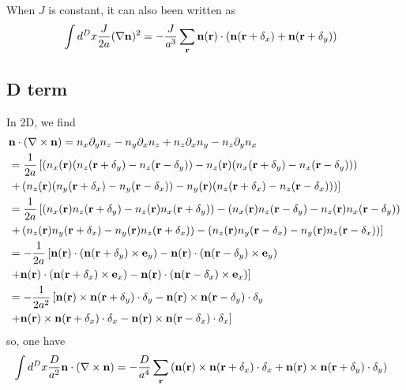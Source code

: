 \documentclass[aps,superscriptaddress,groupedaddress]{revtex4}  %
\begin{document}
When $J$ is constant, it can also been written as
\begin{equation}
\begin{split}
&\int d^D x\frac{J}{2a}(\nabla {\bf n})^2=-\frac{J}{a^3}\sum _{{\bf r}}{\bf n}({\bf r})\cdot \left( {\bf n}({\bf r}+\delta _x)+{\bf n}({\bf r}+\delta _y)\right)
\end{split}
\end{equation}


\subsection{\label{sec:2.3}D term}

In 2D, we find
\begin{equation}
\begin{split}
&{\bf n}\cdot (\nabla \times {\bf n})=n_x \partial _y n_z-n_y \partial _x n_z+n_z\partial _x n_y-n_z \partial _y n_x\\
&=\frac{1}{2a}\left[\left(n_x({\bf r})(n_z({\bf r}+\delta _y)-n_z({\bf r}-\delta _y))-n_z({\bf r})(n_x({\bf r}+\delta _y)-n_x({\bf r}-\delta _y))\right)\right.\\
&\left.+\left(n_z({\bf r})(n_y({\bf r}+\delta _x)-n_y({\bf r}-\delta _x))-n_y({\bf r})(n_z({\bf r}+\delta _x)-n_z({\bf r}-\delta _x))\right)\right]\\
&=\frac{1}{2a}\left[\left(n_x({\bf r})n_z({\bf r}+\delta _y)-n_z({\bf r})n_x({\bf r}+\delta _y)\right)-\left(n_x({\bf r})n_z({\bf r}-\delta _y)-n_z({\bf r})n_x({\bf r}-\delta _y)\right)\right.\\
&\left.+\left(n_z({\bf r})n_y({\bf r}+\delta _x)-n_y({\bf r})n_z({\bf r}+\delta _x)\right)-\left(n_z({\bf r})n_y({\bf r}-\delta _x)-n_y({\bf r})n_z({\bf r}-\delta _x)\right)\right]\\
&=-\frac{1}{2a}\left[{\bf n}({\bf r})\cdot \left({\bf n}({\bf r}+\delta _y)\times {\bf e}_y\right)-{\bf n}({\bf r})\cdot \left({\bf n}({\bf r}-\delta _y)\times {\bf e}_y\right)\right.\\
&\left.+{\bf n}({\bf r})\cdot \left({\bf n}({\bf r}+\delta _x)\times {\bf e}_x\right)-{\bf n}({\bf r})\cdot \left({\bf n}({\bf r}-\delta _x)\times {\bf e}_x\right)\right]\\
&=-\frac{1}{2a^2}\left[{\bf n}({\bf r})\times {\bf n}({\bf r}+\delta _y)\cdot \delta_y-{\bf n}({\bf r})\times {\bf n}({\bf r}-\delta _y)\cdot \delta_y\right.\\
&\left.+{\bf n}({\bf r})\times{\bf n}({\bf r}+\delta _x)\cdot \delta_x-{\bf n}({\bf r})\times {\bf n}({\bf r}-\delta _x)\cdot \delta_x\right]\\
\end{split}
\end{equation}
so, one have
\begin{equation}
\begin{split}
&\int d^D x\frac{D}{a^2}{\bf n}\cdot (\nabla \times {\bf n})=-\frac{D}{a^4}\sum _{{\bf r}}\left({\bf n}({\bf r})\times  {\bf n}({\bf r}+\delta _x) \cdot \delta _x+{\bf n}({\bf r})\times  {\bf n}({\bf r}+\delta _y) \cdot \delta _y\right)
\end{split}
\end{equation}
\end{document}
